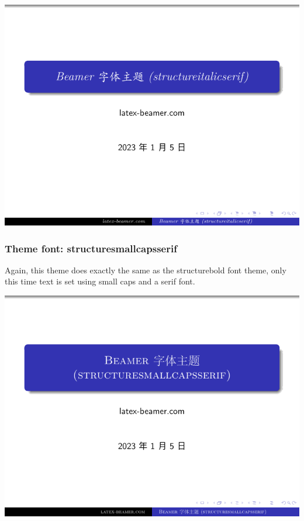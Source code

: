 \includegraphics[page=2]{examples/beamer/beamerfont09.pdf}

\subsubsection{Theme font: {\ttfamily structuresmallcapsserif}}

Again, this theme does exactly the same as the structurebold font theme, only this time text is set using small caps and a serif font.

\includegraphics[page=1]{examples/beamer/beamerfont10.pdf}

